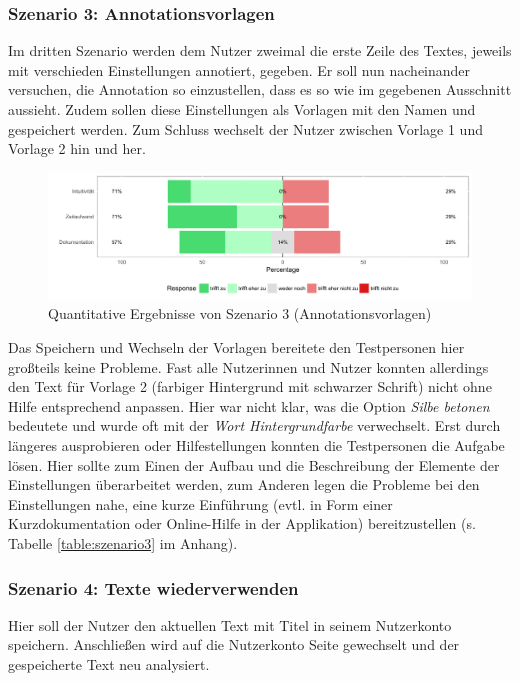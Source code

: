 \subsubsection{Szenario 3: Annotationsvorlagen}

Im dritten Szenario werden dem Nutzer zweimal die erste Zeile des Textes, jeweils mit verschieden Einstellungen annotiert, gegeben. Er soll nun nacheinander versuchen, die Annotation so einzustellen, dass es so wie im gegebenen Ausschnitt aussieht. Zudem sollen diese Einstellungen als Vorlagen mit den Namen  und  gespeichert werden. Zum Schluss wechselt der Nutzer zwischen Vorlage 1 und Vorlage 2 hin und her.

\begin{figure}[h!]
	\centering
	\includegraphics[width=.8\linewidth]{figures/evaluation/scenario3}
	\caption{Quantitative Ergebnisse von Szenario 3 (Annotationsvorlagen)}
	\label{fig:evaluation-sc3}
\end{figure}

Das Speichern und Wechseln der Vorlagen bereitete den Testpersonen hier großteils keine Probleme. Fast alle Nutzerinnen und Nutzer konnten allerdings den Text für Vorlage 2 (farbiger Hintergrund mit schwarzer Schrift) nicht ohne Hilfe entsprechend anpassen. Hier war nicht klar, was die Option \textit{Silbe betonen} bedeutete und wurde oft mit der \textit{Wort Hintergrundfarbe} verwechselt. Erst durch längeres ausprobieren oder Hilfestellungen konnten die Testpersonen die Aufgabe lösen. Hier sollte zum Einen der Aufbau und die Beschreibung der Elemente der Einstellungen überarbeitet werden, zum Anderen legen die Probleme bei den Einstellungen nahe, eine kurze Einführung (evtl. in Form einer Kurzdokumentation oder Online-Hilfe in der Applikation) bereitzustellen (s. Tabelle \ref{table:szenario3} im Anhang).

\subsubsection{Szenario 4: Texte wiederverwenden}

Hier soll der Nutzer den aktuellen Text mit Titel in seinem Nutzerkonto speichern. Anschließen wird auf die Nutzerkonto Seite gewechselt und der gespeicherte Text neu analysiert.

